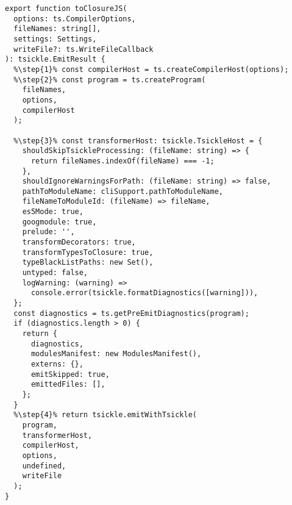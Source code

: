 \begin{verbatim}
export function toClosureJS(
  options: ts.CompilerOptions,
  fileNames: string[],
  settings: Settings,
  writeFile?: ts.WriteFileCallback
): tsickle.EmitResult {
  %\step{1}% const compilerHost = ts.createCompilerHost(options);
  %\step{2}% const program = ts.createProgram(
    fileNames,
    options,
    compilerHost
  );

  %\step{3}% const transformerHost: tsickle.TsickleHost = {
    shouldSkipTsickleProcessing: (fileName: string) => {
      return fileNames.indexOf(fileName) === -1;
    },
    shouldIgnoreWarningsForPath: (fileName: string) => false,
    pathToModuleName: cliSupport.pathToModuleName,
    fileNameToModuleId: (fileName) => fileName,
    es5Mode: true,
    googmodule: true,
    prelude: '',
    transformDecorators: true,
    transformTypesToClosure: true,
    typeBlackListPaths: new Set(),
    untyped: false,
    logWarning: (warning) =>
      console.error(tsickle.formatDiagnostics([warning])),
  };
  const diagnostics = ts.getPreEmitDiagnostics(program);
  if (diagnostics.length > 0) {
    return {
      diagnostics,
      modulesManifest: new ModulesManifest(),
      externs: {},
      emitSkipped: true,
      emittedFiles: [],
    };
  }
  %\step{4}% return tsickle.emitWithTsickle(
    program,
    transformerHost,
    compilerHost,
    options,
    undefined,
    writeFile
  );
}
\end{verbatim}
